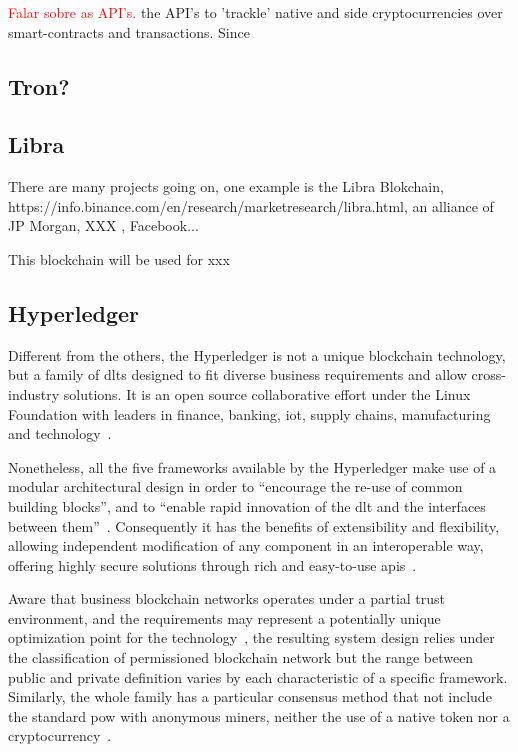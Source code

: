 \textcolor{red}{Falar sobre as API's.}
 the API's to 'trackle' native and side cryptocurrencies over smart-contracts and transactions.
Since


\subsection{Tron?}
\label{ssec:tron}

\subsection{Libra}
\label{ssec:libra}

There are many projects going on, one example is the Libra Blokchain, https://info.binance.com/en/research/marketresearch/libra.html, an alliance of JP Morgan, XXX , Facebook...

This blockchain will be used for xxx


\subsection{Hyperledger}
\label{ssec:hyperledger}

Different from the others, the Hyperledger is not a unique blockchain technology, but a family of \glspl{dlt} designed to fit diverse business requirements and allow cross-industry solutions.
It is an open source collaborative effort under the Linux Foundation with leaders in finance, banking, \gls{iot}, supply chains, manufacturing and technology~\cite{hyper1}.

Nonetheless, all the five frameworks available by the Hyperledger make use of a modular architectural design in order to ``encourage the re-use of common building blocks'', and to ``enable rapid innovation of the \gls{dlt} and the interfaces between them''~\cite{hyper2}.
Consequently it has the benefits of extensibility and flexibility,
allowing independent modification of any component in an interoperable way,
offering highly secure solutions through rich and easy-to-use \glspl{api}~\cite{hyper1, hyper2}.

Aware that business blockchain networks operates under a partial trust environment, and the requirements may represent a potentially unique optimization point for the technology~\cite{hyper2},
the resulting system design relies under the classification of permissioned blockchain network but the range between public and private definition varies by each characteristic of a specific framework.
Similarly, the whole family has a particular consensus method that not include the standard \gls{pow} with anonymous miners, neither the use of a native token nor a cryptocurrency~\cite{hyper1}.

